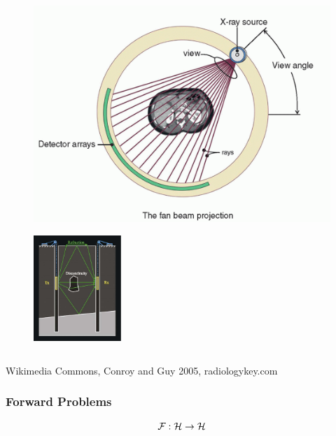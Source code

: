 \documentclass{beamer}
\begin{document}
\begin{frame}
\begin{columns}
\begin{column}{0.5\textwidth}
      \begin{figure}
        \centering
        \includegraphics[width=\linewidth]{CT.png}
      \end{figure}

      \begin{figure}
        \centering
        \includegraphics[width=\linewidth, height=4cm]{borehole.png}
      \end{figure}
      
    \end{column}
  \end{columns}
  \footnotesize{Wikimedia Commons, Conroy and Guy 2005, radiologykey.com }
\end{frame}


\begin{frame}
\frametitle{Forward Problems}

\[
\mathcal{F}: \mathcal{H} \to \mathcal{H}
\]

\begin{figure}
  \centering
\end{figure}
\end{frame}
\end{document}
